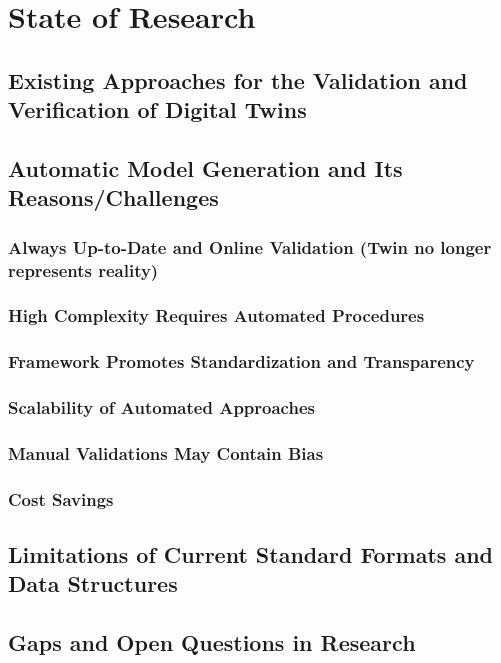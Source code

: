 \chapter{State of Research}
\label{chap:research}

\section{Existing Approaches for the Validation and Verification of Digital Twins}

\section{Automatic Model Generation and Its Reasons/Challenges}
\subsection{Always Up-to-Date and Online Validation (Twin no longer represents reality)}
\subsection{High Complexity Requires Automated Procedures}
\subsection{Framework Promotes Standardization and Transparency}
\subsection{Scalability of Automated Approaches}
\subsection{Manual Validations May Contain Bias}
\subsection{Cost Savings}

\section{Limitations of Current Standard Formats and Data Structures}

\section{Gaps and Open Questions in Research}
